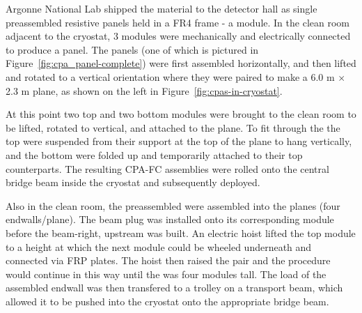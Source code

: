 Argonne National Lab shipped the  material to the detector hall as single preassembled resistive panels held in a FR4 frame - a  module. 
In the clean room adjacent to the  cryostat, 3  modules were mechanically and electrically connected to produce a  panel. %
The  panels (one of which is pictured in Figure~\ref{fig:cpa_panel-complete}) were first assembled horizontally, and then lifted and rotated to a vertical orientation where they were paired to make a 6.0 m $\times$ 2.3 m  plane, as shown on the left in Figure~\ref{fig:cpas-in-cryostat}.

At this point two top and two bottom  modules were brought to the clean room to be lifted, rotated to vertical, and attached to the  plane. 
To fit through the  the top  were suspended from their support at the top of the  plane to hang vertically, and the bottom  were folded up and temporarily attached to their top  counterparts.
The resulting CPA-FC assemblies were rolled onto the central bridge beam inside the cryostat and subsequently deployed. 

Also in the  clean room, the preassembled  %
were assembled into the  planes (four endwalls/plane). %
The beam plug was installed onto its corresponding module %
before the beam-right, upstream  was built.
An electric hoist lifted the top %
module to a height at which the next %
module could be wheeled underneath and connected via FRP plates.
The hoist then raised the pair and the procedure would continue in this way until the  was four %
modules tall.
The load of the assembled endwall was then transfered to a trolley on a transport beam, which allowed it to be pushed into the cryostat onto the appropriate bridge beam.

